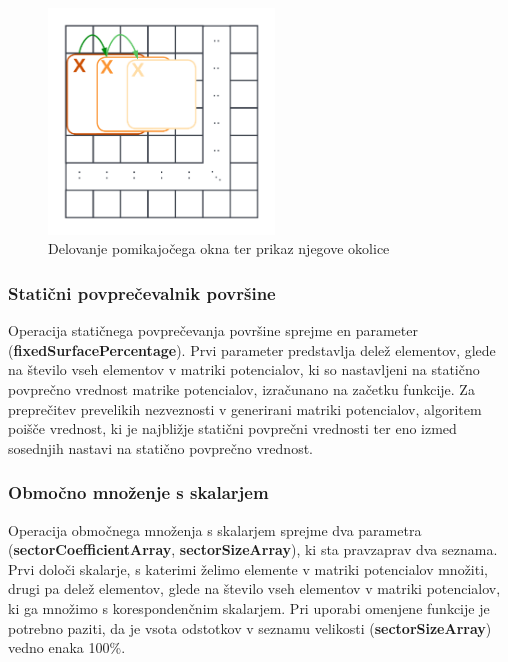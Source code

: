 \documentclass[a4paper,twoside,openright,12pt,slovene]{book}
\begin{document}
\begin{figure}[H]
    \centering
    \includegraphics[width=60mm]{Slike/Dinamični povprečevalnik.png}
    \caption{Delovanje pomikajočega okna ter prikaz njegove okolice}
    \label{fig:pomikajočeOkno}
\end{figure}


\subsubsection{Statični povprečevalnik površine}
\label{statičniPovprečevalnik}

Operacija statičnega povprečevanja površine sprejme en parameter (\textbf{fixedSurfacePercentage}). Prvi parameter predstavlja delež elementov, glede na število vseh elementov v matriki potencialov, ki so nastavljeni na statično povprečno vrednost matrike potencialov, izračunano na začetku funkcije. Za preprečitev prevelikih nezveznosti v generirani matriki potencialov, algoritem poišče vrednost, ki je najbližje statični povprečni vrednosti ter eno izmed sosednjih nastavi na statično povprečno vrednost.


\subsubsection{Območno množenje s skalarjem}
\label{območnoMnoženje}

Operacija območnega množenja s skalarjem sprejme dva parametra (\textbf{sectorCoefficientArray}, \textbf{sectorSizeArray}), ki sta pravzaprav dva seznama. Prvi določi skalarje, s katerimi želimo elemente v matriki potencialov množiti, drugi pa delež elementov, glede na število vseh elementov v matriki potencialov, ki ga množimo s korespondenčnim skalarjem. Pri uporabi omenjene funkcije je potrebno paziti, da je vsota odstotkov v seznamu velikosti (\textbf{sectorSizeArray}) vedno enaka 100\%.
\end{document}

